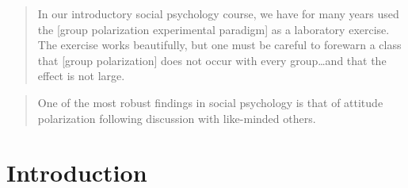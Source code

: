\documentclass[11pt, letterpaper]{article}
\begin{document}
\clearpage

\begin{quote}
In our introductory social psychology course, 
we have for many years used the [group polarization experimental paradigm] as
a laboratory exercise. The exercise works beautifully, but one must be
careful to forewarn a class that [group polarization] does not occur with every 
group\ldots and that the effect is not large. 
\par\raggedleft\cite[p. 205]{Brown1986}
\end{quote}

\begin{quote}
One of the most robust findings in social psychology is that of attitude polarization 
following discussion with like-minded others.
\par\raggedleft\cite[p. 267]{Cooper2001}
\end{quote}

\section{Introduction}
\end{document}
